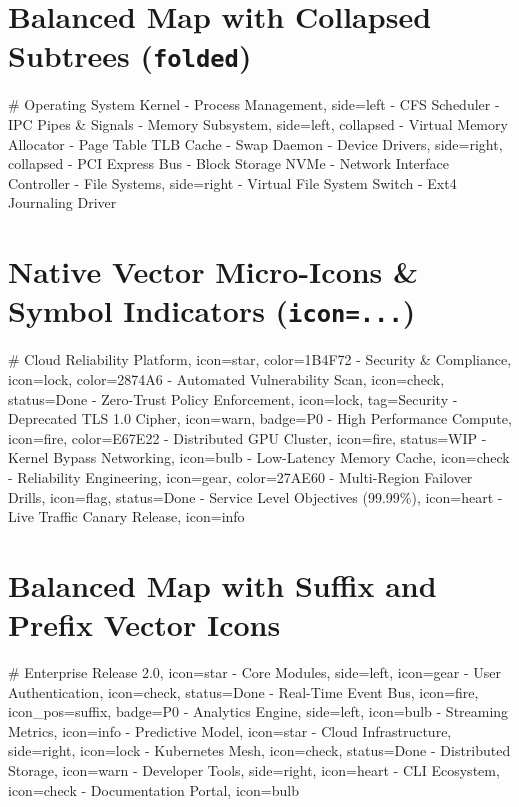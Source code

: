 \documentclass{article}
\begin{document}
\vspace{1cm}

\section*{Balanced Map with Collapsed Subtrees (\texttt{folded})}

\begin{mindchart}[theme=nord, layout=balanced, style=underline, line=curve, scale=0.60]
# Operating System Kernel
  - Process Management, side=left
    - CFS Scheduler
    - IPC Pipes \& Signals
  - Memory Subsystem, side=left, collapsed
    - Virtual Memory Allocator
    - Page Table TLB Cache
    - Swap Daemon
  - Device Drivers, side=right, collapsed
    - PCI Express Bus
    - Block Storage NVMe
    - Network Interface Controller
  - File Systems, side=right
    - Virtual File System Switch
    - Ext4 Journaling Driver
\end{mindchart}

\newpage

\section*{Native Vector Micro-Icons \& Symbol Indicators (\texttt{icon=...})}

\begin{mindchart}[theme=rainbow, layout=right, style=classic, line=tapered, scale=0.68]
# Cloud Reliability Platform, icon=star, color=1B4F72
  - Security \& Compliance, icon=lock, color=2874A6
    - Automated Vulnerability Scan, icon=check, status=Done
    - Zero-Trust Policy Enforcement, icon=lock, tag=Security
    - Deprecated TLS 1.0 Cipher, icon=warn, badge=P0
  - High Performance Compute, icon=fire, color=E67E22
    - Distributed GPU Cluster, icon=fire, status=WIP
    - Kernel Bypass Networking, icon=bulb
    - Low-Latency Memory Cache, icon=check
  - Reliability Engineering, icon=gear, color=27AE60
    - Multi-Region Failover Drills, icon=flag, status=Done
    - Service Level Objectives (99.99\%), icon=heart
    - Live Traffic Canary Release, icon=info
\end{mindchart}

\vspace{1cm}

\section*{Balanced Map with Suffix and Prefix Vector Icons}

\begin{mindchart}[theme=nord, layout=balanced, style=boxed, line=elbow, scale=0.60]
# Enterprise Release 2.0, icon=star
  - Core Modules, side=left, icon=gear
    - User Authentication, icon=check, status=Done
    - Real-Time Event Bus, icon=fire, icon_pos=suffix, badge=P0
  - Analytics Engine, side=left, icon=bulb
    - Streaming Metrics, icon=info
    - Predictive Model, icon=star
  - Cloud Infrastructure, side=right, icon=lock
    - Kubernetes Mesh, icon=check, status=Done
    - Distributed Storage, icon=warn
  - Developer Tools, side=right, icon=heart
    - CLI Ecosystem, icon=check
    - Documentation Portal, icon=bulb
\end{mindchart}
\end{document}
